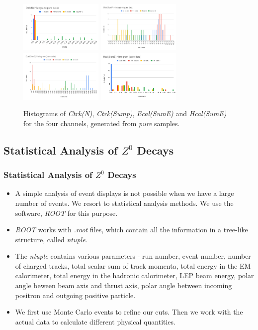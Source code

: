 \documentclass[10pt]{beamer}
\begin{document}
\begin{frame}
\begin{figure}[h!]
  \centering
  \includegraphics[width = 4cm]{CtrkN-pure.png}
  \includegraphics[width = 4cm]{CtrkP-pure.png}
  \includegraphics[width = 4cm]{Ecal-pure.png}
  \includegraphics[width = 4cm]{Hcal-pure.png}
  \caption{Histograms of \textit{Ctrk(N)}, \textit{Ctrk(Sump)}, \textit{Ecal(SumE)} and \textit{Hcal(SumE)} for the four channels, generated from \textit{pure} samples.}
  \label{fig:hist}
\end{figure}
\end{frame}

\subsection{Statistical Analysis of $Z^0$ Decays}
\begin{frame}
\frametitle{Statistical Analysis of $Z^0$ Decays}
\begin{itemize}
  \item A simple analysis of event displays is not possible when we have a large number of events. We resort to statistical analysis methods. We use the software, \textit{ROOT} for this purpose.
  \item \textit{ROOT} works with \textit{.root} files, which contain all the information in a tree-like structure, called \textit{ntuple}.
  \item The \textit{ntuple} contains various parameters - run number, event number, number of charged tracks, total scalar sum of track momenta, total energy in the EM calorimeter, total energy in the hadronic calorimeter, LEP beam energy, polar angle beween beam axis and thrust axis, polar angle between incoming positron and outgoing positive particle.
  \item We first use Monte Carlo events to refine our cuts. Then we work with the actual data to calculate different physical quantities.
\end{itemize}
\end{frame}
\end{document}
